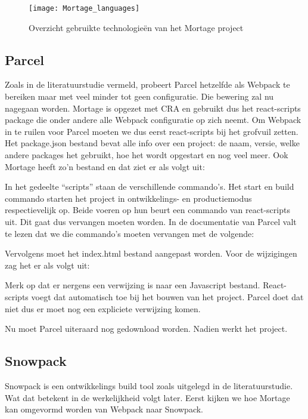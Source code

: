 \begin{figure}[h]
   \texttt{[image: Mortage\_languages]}
       \centering
       \caption{Overzicht gebruikte technologieën van het Mortage project}
 \end{figure}

\subsection{Parcel}
Zoals in de literatuurstudie vermeld, probeert Parcel hetzelfde als Webpack te bereiken maar met veel minder tot geen configuratie. Die bewering zal nu nagegaan worden. Mortage is opgezet met CRA en gebruikt dus het react-scripts package die onder andere alle Webpack configuratie op zich neemt. Om Webpack in te ruilen voor Parcel moeten we dus eerst react-scripts bij het grofvuil zetten. Het package.json bestand bevat alle info over een project: de naam, versie, welke andere packages het gebruikt, hoe het wordt opgestart en nog veel meer. Ook Mortage heeft zo’n bestand en dat ziet er als volgt uit:



In het gedeelte “scripts” staan de verschillende commando’s. Het start en build commando starten het project in ontwikkelings- en productiemodus respectievelijk op. Beide voeren op hun beurt een commando van react-scripts uit. Dit gaat dus vervangen moeten worden. In de documentatie van Parcel valt te lezen dat we die commando’s moeten vervangen met de volgende:



Vervolgens moet het index.html bestand aangepast worden. Voor de wijzigingen zag het er als volgt uit:



Merk op dat er nergens een verwijzing is naar een Javascript bestand. React-scripts voegt dat automatisch toe bij het bouwen van het project. Parcel doet dat niet dus er moet nog een expliciete verwijzing komen.



Nu moet Parcel uiteraard nog gedownload worden. Nadien werkt het project.

\subsection{Snowpack}
Snowpack is een ontwikkelings build tool zoals uitgelegd in de literatuurstudie. Wat dat betekent in de werkelijkheid volgt later. Eerst kijken we hoe Mortage kan omgevormd worden van Webpack naar Snowpack.

